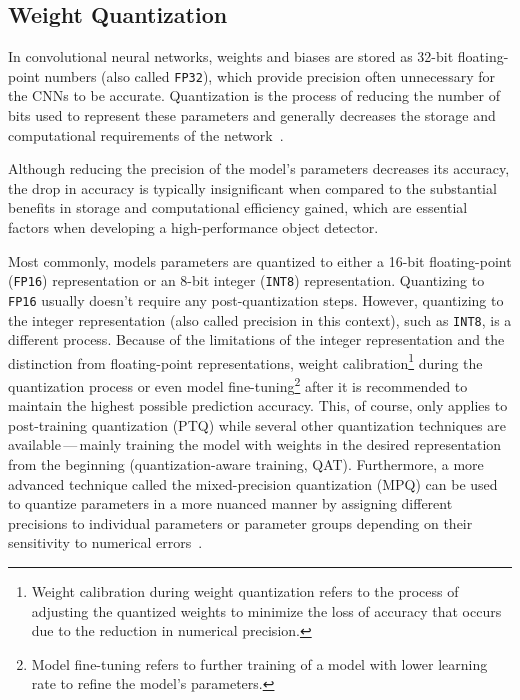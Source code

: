 


\subsection{Weight Quantization}

In convolutional neural networks, weights and biases are stored as 32-bit
floating-point numbers (also called \texttt{FP32}), which provide precision often
unnecessary for the CNNs to be accurate. Quantization is the process of reducing
the number of bits used to represent these parameters and generally decreases
the storage and computational requirements of the network~\cite{Choudhary2020}.

Although reducing the precision of the model's parameters decreases its
accuracy, the drop in accuracy is typically insignificant when compared to the
substantial benefits in storage and computational efficiency gained, which are
essential factors when developing a high-performance object detector.

Most commonly, models parameters are quantized to either a 16-bit floating-point
(\texttt{FP16}) representation or an 8-bit integer (\texttt{INT8})
representation. Quantizing to \texttt{FP16} usually doesn't require any
post-quantization steps. However, quantizing to the integer representation (also
called precision in this context), such as \texttt{INT8}, is a different
process. Because of the limitations of the integer representation and the
distinction from floating-point representations, weight
calibration\footnote{Weight calibration during weight quantization refers to the
process of adjusting the quantized weights to minimize the loss of accuracy that
occurs due to the reduction in numerical precision.} during the quantization
process or even model fine-tuning\footnote{Model fine-tuning refers to further
training of a model with lower learning rate to refine the model's parameters.}
after it is recommended to maintain the highest possible prediction accuracy.
This, of course, only applies to post-training quantization (PTQ) while several
other quantization techniques are available\,---\,mainly training the model with
weights in the desired representation from the beginning (quantization-aware
training, QAT). Furthermore, a more advanced technique called the
mixed-precision quantization (MPQ) can be used to quantize parameters in a more
nuanced manner by assigning different precisions to individual parameters or
parameter groups depending on their sensitivity to numerical
errors~\cite{Tang2022}.

